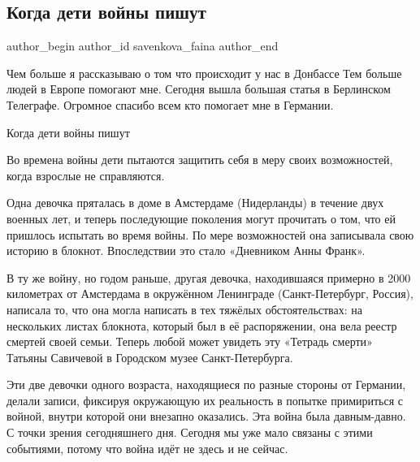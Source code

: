  
 
 
 
 
 
\subsection{Когда дети войны пишут}
\label{sec:04_01_2022.fb.savenkova_faina.1.kogda_deti_vojny_pishut}
 
\ifcmt
 author_begin
   author_id savenkova_faina
 author_end
\fi

Чем больше я рассказываю о том что происходит у нас в Донбассе Тем больше людей
в Европе помогают мне. Сегодня вышла большая статья в Берлинском Телеграфе.
Огромное спасибо всем кто помогает мне в Германии.


Когда дети войны пишут

Во времена войны дети пытаются защитить себя в меру своих возможностей, когда
взрослые не справляются.

Одна девочка пряталась в доме в Амстердаме (Нидерланды) в течение двух военных
лет, и теперь последующие поколения могут прочитать о том, что ей пришлось
испытать во время войны. По мере возможностей она записывала свою историю в
блокнот. Впоследствии это стало «Дневником Анны Франк».

В ту же войну, но годом раньше, другая девочка, находившаяся примерно в 2000
километрах от Амстердама в окружённом Ленинграде (Санкт-Петербург, Россия),
написала то, что она могла написать в тех тяжёлых обстоятельствах: на
нескольких листах блокнота, который был в её распоряжении, она вела реестр
смертей своей семьи. Теперь любой может увидеть эту «Тетрадь смерти» Татьяны
Савичевой в Городском музее Санкт-Петербурга.

Эти две девочки одного возраста, находящиеся по разные стороны от Германии,
делали записи, фиксируя окружающую их реальность в попытке примириться с
войной, внутри которой они внезапно оказались. Эта война была давным-давно. С
точки зрения сегодняшнего дня. Сегодня мы уже мало связаны с этими событиями,
потому что война идёт не здесь и не сейчас.

